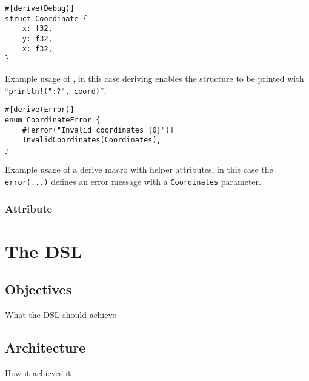 \begin{listing}
    \centering
    \begin{verbatim}
#[derive(Debug)]
struct Coordinate {
    x: f32,
    y: f32,
    x: f32,
}
    \end{verbatim}
    \caption{
        Example usage of \keyword{\#[derive(...)]},
        in this case deriving  enables the structure to be printed with
        “\texttt{println!("{:?}", coord)}”.
    }
    \label{lst:rust-derive-debug}
\end{listing}

\begin{listing}
    \centering
    \begin{verbatim}
#[derive(Error)]
enum CoordinateError {
    #[error("Invalid coordinates {0}")]
    InvalidCoordinates(Coordinates),
}
    \end{verbatim}
    \caption{
        Example usage of a derive macro with helper attributes,
        in this case the \texttt{error(...)} defines an error message with a \texttt{Coordinates} parameter.
    }
    \label{lst:rust-derive-error}
\end{listing}

\subsubsection*{Attribute}

\section{The DSL}
\subsection{Objectives}
What the DSL should achieve
\subsection{Architecture}
How it achieves it